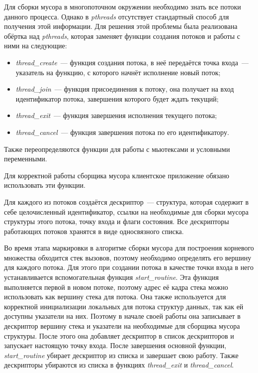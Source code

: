 Для сборки мусора в многопоточном окружении необходимо знать все потоки данного процесса. Однако в \textit{pthreads} отсутствует стандартный способ для получения этой информации.
Для решения этой проблемы была реализована обёртка над \textit{pthreads}, которая заменяет функции создания потоков и работы с ними на следующие:
\begin{itemize}
\item \textit{thread\_create}~--- функция создания потока, в неё передаётся
точка входа~--- указатель на функцию, с которого начнёт исполнение новый поток;
\item \textit{thread\_join}~--- функция присоединения к потоку, она получает на вход идентификатор потока, завершения которого будет ждать текущий;
\item \textit{thread\_exit}~--- функция завершения исполнения текущего потока;
\item \textit{thread\_cancel}~--- функция завершения потока по его идентификатору.
\end{itemize}

Также переопределяются функции для работы с мьютексами и условными переменными.

Для корректной работы сборщика мусора клиентское приложение обязано использовать эти функции.

Для каждого из потоков создаётся дескриптор~--- структура, которая содержит
в себе целочисленный идентификатор, ссылки на необходимые для сборки мусора
структуры этого потока, точку входа и флаги состояния. Все дескрипторы работающих потоков хранятся в виде односвязного списка.

Во время этапа маркировки в алгоритме сборки мусора для построения корневого множества обходится стек вызовов, поэтому необходимо определять его вершину для каждого потока.  Для этого при создании потока в качестве точки входа в него устанавливается вспомогательная функция \textit{start\_routine}. Эта функция выполняется первой в новом потоке, поэтому адрес её кадра стека можно использовать как вершину стека для потока. Она также используется для корректной инициализации локальных для потока структур данных, так как ей доступны указатели на них. Поэтому в начале своей работы она записывает в дескриптор вершину стека и указатели на необходимые для сборщика мусора структуры. После этого она добавляет дескриптор
в список дескрипторов и запускает настоящую точку входа. После завершения основной функции, 
 \textit{start\_routine} убирает дескриптор из списка и завершает свою работу.
Также дескрипторы убираются из списка в функциях \textit{thread\_exit} и \textit{thread\_cancel}.

